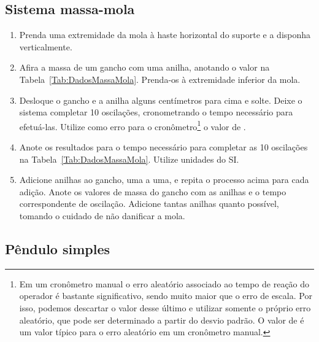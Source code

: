 \subsection{Sistema massa-mola}

\begin{enumerate}
\item Prenda uma extremidade da mola à haste horizontal do suporte e a disponha verticalmente.
\item Afira a massa de um gancho com uma anilha, anotando o valor na Tabela~\ref{Tab:DadosMassaMola}. Prenda-os à extremidade inferior da mola.
\item Desloque o gancho e a anilha alguns centímetros para cima e solte. Deixe o sistema completar 10 oscilações, cronometrando o tempo necessário para efetuá-las. Utilize como erro para o cronômetro\footnote{Em um cronômetro manual o erro aleatório associado ao tempo de reação do operador é bastante significativo, sendo muito maior que o erro de escala. Por isso, podemos descartar o valor desse último e utilizar somente o próprio erro aleatório, que pode ser determinado a partir do desvio padrão. O valor de  é um valor típico para o erro aleatório em um cronômetro manual.} o valor de .
\item Anote os resultados para o tempo necessário para completar as 10 oscilações na Tabela~\ref{Tab:DadosMassaMola}. Utilize unidades do SI.
\item Adicione anilhas ao gancho, uma a uma, e repita o processo acima para cada adição. Anote os valores de massa do gancho com as anilhas e o tempo correspondente de oscilação. Adicione tantas anilhas quanto possível, tomando o cuidado de não danificar a mola.
\end{enumerate}

\subsection{Pêndulo simples}


